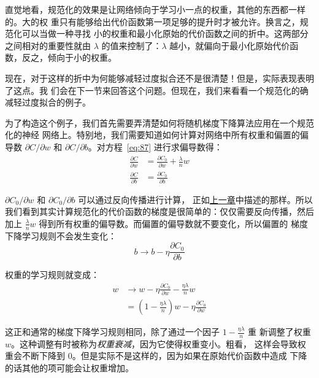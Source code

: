 直觉地看，规范化的效果是让网络倾向于学习小一点的权重，其他的东西都一样的。大的权
重只有能够给出代价函数第一项足够的提升时才被允许。换言之，规范化可以当做一种寻找
小的权重和最小化原始的代价函数之间的折中。这两部分之间相对的重要性就由 $\lambda$
的值来控制了：$\lambda$ 越小，就偏向于最小化原始代价函数，反之，倾向于小的权重。

现在，对于这样的折中为何能够减轻过度拟合还不是很清楚！但是，实际表现表明了这点。我
们会在下一节来回答这个问题。但现在，我们来看看一个规范化的确减轻过度拟合的例子。

为了构造这个例子，我们首先需要弄清楚如何将随机梯度下降算法应用在一个规范化的神经
网络上。特别地，我们需要知道如何计算对网络中所有权重和偏置的偏导数 $\partial
C/\partial w$ 和 $\partial C/\partial b$。对方程~\eqref{eq:87} 进行求偏导数得：
\begin{align}
  \frac{\partial C}{\partial w} & = \frac{\partial C_0}{\partial w} +
                                  \frac{\lambda}{n} w \label{eq:88}\tag{88} \\
  \frac{\partial C}{\partial b} & = \frac{\partial C_0}{\partial b} \label{eq:89}\tag{89}
\end{align}

$\partial C_0/\partial w$ 和 $\partial C_0/\partial b$ 可以通过反向传播进行计算，
正如\hyperref[ch:HowTheBackpropagationAlgorithmWorks]{上一章}中描述的那样。所以
我们看到其实计算规范化的代价函数的梯度是很简单的：仅仅需要反向传播，然后加上
$\frac{\lambda}{n} w$ 得到所有权重的偏导数。而偏置的偏导数就不要变化，所以偏置的
梯度下降学习规则不会发生变化：
\begin{equation}
  b \rightarrow b -\eta \frac{\partial C_0}{\partial b}
  \label{eq:90}\tag{90}
\end{equation}

权重的学习规则就变成：
\begin{align}
  w & \rightarrow w-\eta \frac{\partial C_0}{\partial
      w}-\frac{\eta \lambda}{n} w \label{eq:91}\tag{91}\\
    & = \left(1-\frac{\eta \lambda}{n}\right) w -\eta \frac{\partial
      C_0}{\partial w} \label{eq:92}\tag{92}
\end{align}

这正和通常的梯度下降学习规则相同，除了通过一个因子 $1-\frac{\eta\lambda}{n}$ 重
新调整了权重 $w$。这种调整有时被称为\emph{权重衰减}，因为它使得权重变小。粗看，
这样会导致权重会不断下降到 $0$。但是实际不是这样的，因为如果在原始代价函数中造成
下降的话其他的项可能会让权重增加。

